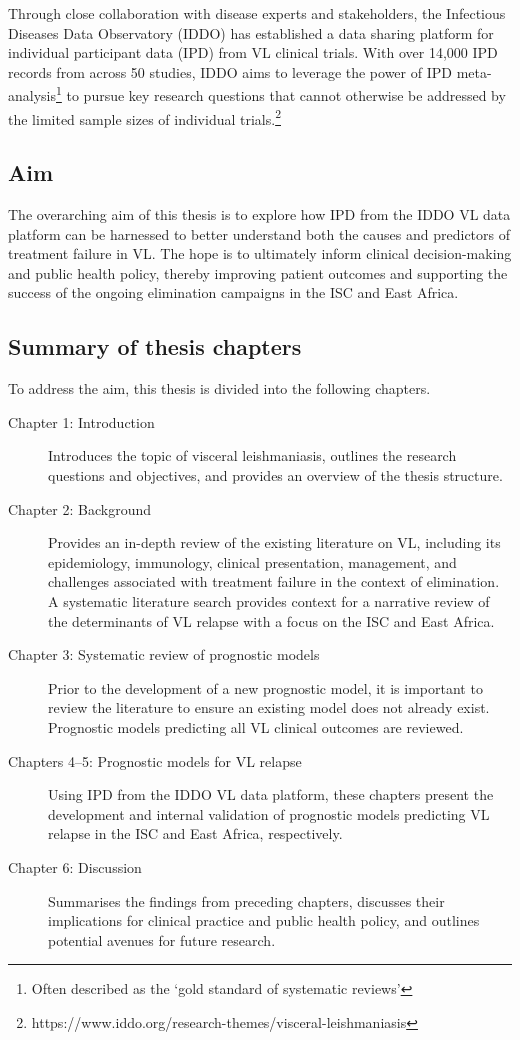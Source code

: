 \documentclass[11pt,a4paper]{article}
\begin{document}
Through close collaboration with disease experts and stakeholders, the Infectious Diseases Data Observatory (IDDO) has established a data sharing platform for individual participant data (IPD) from VL clinical trials. With over 14,000 IPD records from across 50 studies, IDDO aims to leverage the power of IPD meta-analysis\footnote{Often described as the `gold standard of systematic reviews' } to pursue key research questions that cannot otherwise be addressed by the limited sample sizes of individual trials.\footnote{https://www.iddo.org/research-themes/visceral-leishmaniasis}

\subsection*{Aim}

The overarching aim of this thesis is to explore how IPD from the IDDO VL data platform can be harnessed to better understand both the causes and predictors of treatment failure in VL. The hope is to ultimately inform clinical decision-making and public health policy, thereby improving patient outcomes and supporting the success of the ongoing elimination campaigns in the ISC and East Africa.

\subsection*{Summary of thesis chapters}

To address the aim, this thesis is divided into the following chapters.
\begin{description}
    \item[Chapter 1: Introduction] Introduces the topic of visceral leishmaniasis, outlines the research questions and objectives, and provides an overview of the thesis structure.
    \item[Chapter 2: Background] Provides an in-depth review of the existing literature on VL, including its epidemiology, immunology, clinical presentation, management, and challenges associated with treatment failure in the context of elimination. A systematic literature search provides context for a narrative review of the determinants of VL relapse with a focus on the ISC and East Africa.
    \item[Chapter 3: Systematic review of prognostic models] Prior to the development of a new prognostic model, it is important to review the literature to ensure an existing model does not already exist. Prognostic models predicting all VL clinical outcomes are reviewed.
    \item[Chapters 4--5: Prognostic models for VL relapse] Using IPD from the IDDO VL data platform, these chapters present the development and internal validation of prognostic models predicting VL relapse in the ISC and East Africa, respectively.
    \item[Chapter 6: Discussion] Summarises the findings from preceding chapters, discusses their implications for clinical practice and public health policy, and outlines potential avenues for future research.
\end{description}
\end{document}
